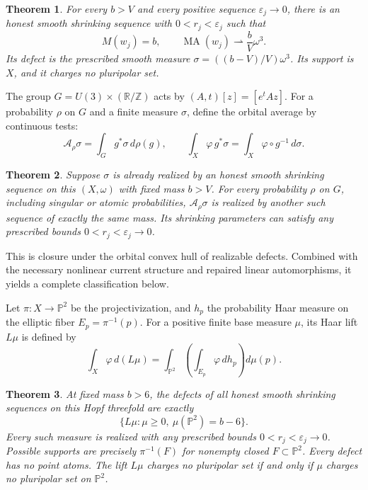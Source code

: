 \documentclass[11pt]{article}
\newtheorem{theorem}{Theorem}
\newcommand{\MA}{\operatorname{MA}}
\begin{document}
\begin{theorem}\label{thm:smooth}
For every $b>V$ and every positive sequence $\varepsilon_j\to0$,
there is an honest smooth shrinking sequence with
$0<r_j<\varepsilon_j$ such that
\[
 M(w_j)=b,\qquad
 \MA(w_j)\rightharpoonup\frac bV\omega^3.
\]
Its defect is the prescribed smooth measure
$\sigma=((b-V)/V)\omega^3$. Its support is $X$, and it charges no
pluripolar set.
\end{theorem}

The group $G=U(3)\times(\mathbb R/\mathbb Z)$ acts by
$(A,t)[z]=[e^tAz]$. For a probability $\rho$ on $G$ and a finite
measure $\sigma$, define the orbital average by continuous tests:
\[
 \mathcal A_\rho\sigma=\int_G g^*\sigma\,d\rho(g),\qquad
 \int_X\varphi\,g^*\sigma=
 \int_X\varphi\circ g^{-1}\,d\sigma.
\]

\begin{theorem}\label{thm:orbit}
Suppose $\sigma$ is already realized by an honest smooth shrinking
sequence on this $(X,\omega)$ with fixed mass $b>V$.
For every probability $\rho$ on $G$, including singular or atomic
probabilities, $\mathcal A_\rho\sigma$ is realized by another such
sequence of exactly the same mass. Its shrinking parameters can satisfy
any prescribed bounds $0<r_j<\varepsilon_j\to0$.
\end{theorem}

This is closure under the orbital convex hull of realizable defects.
Combined with the necessary nonlinear current structure and repaired
linear automorphisms, it yields a complete classification below.

Let $\pi:X\to\mathbb P^2$ be the projectivization, and $h_p$ the
probability Haar measure on the elliptic fiber $E_p=\pi^{-1}(p)$.
For a positive finite base measure $\mu$, its Haar lift $L\mu$ is
defined by
\[
 \int_X\varphi\,d(L\mu)=\int_{\mathbb P^2}
       \left(\int_{E_p}\varphi\,dh_p\right)d\mu(p).
\]

\begin{theorem}\label{thm:classification}
At fixed mass $b>6$, the defects of all honest smooth shrinking
sequences on this Hopf threefold are exactly
\[
 \{L\mu:\mu\geq0,\ \mu(\mathbb P^2)=b-6\}.
\]
Every such measure is realized with any prescribed bounds
$0<r_j<\varepsilon_j\to0$. Possible supports are precisely
$\pi^{-1}(F)$ for nonempty closed $F\subset\mathbb P^2$.
Every defect has no point atoms. The lift $L\mu$ charges no pluripolar
set if and only if $\mu$ charges no pluripolar set on $\mathbb P^2$.
\end{theorem}
\end{document}
